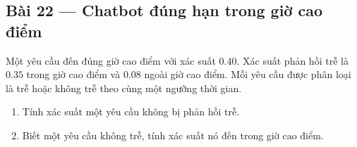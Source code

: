 \documentclass[11pt,a4paper]{article}
\begin{document}
\noindent\begin{minipage}{\linewidth}
\subsection*{Bài 22 --- Chatbot đúng hạn trong giờ cao điểm}

Một yêu cầu đến đúng giờ cao điểm với xác suất \(0.40\). Xác suất phản hồi trễ là \(0.35\) trong giờ cao điểm và \(0.08\) ngoài giờ cao điểm. Mỗi yêu cầu được phân loại là trễ hoặc không trễ theo cùng một ngưỡng thời gian.

\begin{enumerate}[label=\alph*)]
\item Tính xác suất một yêu cầu không bị phản hồi trễ.
\item Biết một yêu cầu không trễ, tính xác suất nó đến trong giờ cao điểm.
\end{enumerate}

\end{minipage}\par

\par\medskip
\end{document}
